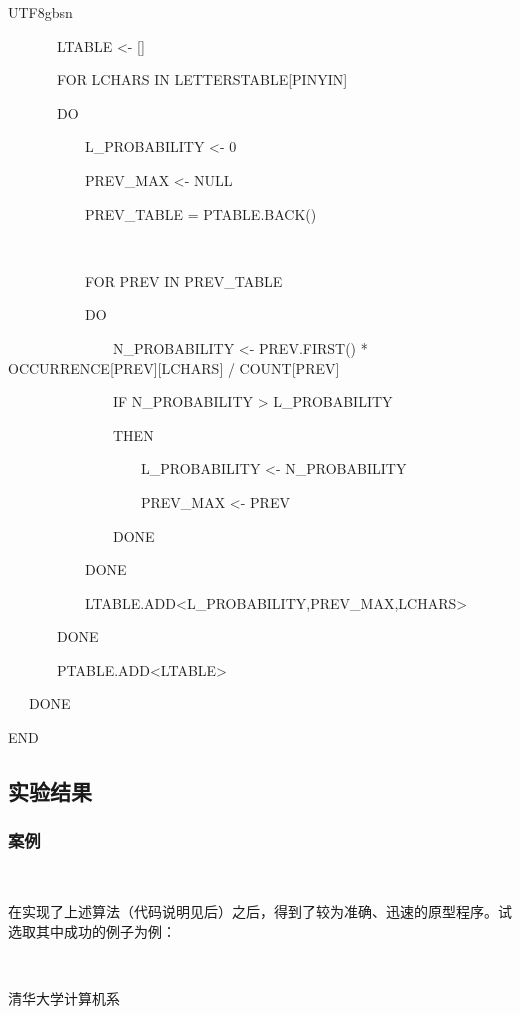 \documentclass{article}
\newenvironment{tmindent}{\begin{tmparmod}{1.5em}{0pt}{0pt}}{\end{tmparmod}}
\newenvironment{tmparmod}[3]{\begin{list}{}{\setlength{\topsep}{0pt}\setlength{\leftmargin}{#1}\setlength{\rightmargin}{#2}\setlength{\parindent}{#3}\setlength{\listparindent}{\parindent}\setlength{\itemindent}{\parindent}\setlength{\parsep}{\parskip}} \item[]}{\end{list}}
\begin{document}
\begin{CJK*}{UTF8}{gbsn}
\begin{tmindent}
{{  \ \ \ \ \ \ \ LTABLE <- []
  
  \ \ \ \ \ \ \ FOR LCHARS IN LETTERSTABLE[PINYIN]
  
  \ \ \ \ \ \ \ DO
  
  \ \ \ \ \ \ \ \ \ \ \ L\_PROBABILITY <- 0
  
  \ \ \ \ \ \ \ \ \ \ \ PREV\_MAX <- NULL
  
  \ \ \ \ \ \ \ \ \ \ \ PREV\_TABLE = PTABLE.BACK()
  
  \
  
  \ \ \ \ \ \ \ \ \ \ \ FOR PREV IN PREV\_TABLE
  
  \ \ \ \ \ \ \ \ \ \ \ DO
  
  \ \ \ \ \ \ \ \ \ \ \ \ \ \ \ N\_PROBABILITY <- PREV.FIRST() *
  OCCURRENCE[PREV][LCHARS] / COUNT[PREV]
  
  \ \ \ \ \ \ \ \ \ \ \ \ \ \ \ IF N\_PROBABILITY > L\_PROBABILITY
  
  \ \ \ \ \ \ \ \ \ \ \ \ \ \ \ THEN
  
  \ \ \ \ \ \ \ \ \ \ \ \ \ \ \ \ \ \ \ L\_PROBABILITY <- N\_PROBABILITY
  
  \ \ \ \ \ \ \ \ \ \ \ \ \ \ \ \ \ \ \ PREV\_MAX <- PREV
  
  \ \ \ \ \ \ \ \ \ \ \ \ \ \ \ DONE
  
  \ \ \ \ \ \ \ \ \ \ \ DONE
  
  \ \ \ \ \ \ \ \ \ \ \ LTABLE.ADD<L\_PROBABILITY,PREV\_MAX,LCHARS>
  
  \ \ \ \ \ \ \ DONE
  
  \ \ \ \ \ \ \ PTABLE.ADD<LTABLE>
  
  \ \ \ DONE
  
  END}}
\end{tmindent}

\subsection{实验结果}

\subsubsection{案例}

\begin{tmindent}
  \
  
  在实现了上述算法（代码说明见后）之后，得到了较为准确、迅速的原型程序。试选取其中成功的例子为例：
  
  \
  
  \begin{tmbothlined}
    \item 清华大学计算机系
    

\end{tmbothlined}
\end{tmindent}
\end{CJK*}
\end{document}
